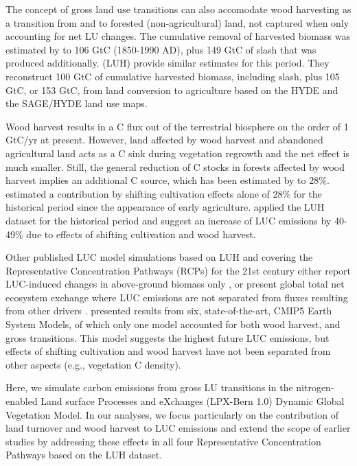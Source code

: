 The concept of gross land use transitions can also accomodate wood harvesting as a transition from and to forested (non-agricultural) land, not captured when only accounting for net LU changes. The cumulative removal of harvested biomass was estimated by \citet{houghton1999tel} to 106 GtC (1850-1990 AD), plus 149 GtC of slash that was produced additionally. \citet{hurtt06gcb} (LUH) provide similar estimates for this period. They reconstruct 100 GtC of cumulative harvested biomass, including slash, plus 105 GtC, or 153 GtC, from land conversion to agriculture based on the HYDE and the SAGE/HYDE land use maps. 

Wood harvest results in a C flux out of the terrestrial biosphere on the order of 1 GtC/yr at present. However, land affected by wood harvest and abandoned agricultural land acts as a C sink during vegetation regrowth and the net effect is much smaller. Still, the general reduction of C stocks in forests affected by wood harvest implies an additional C source, which has been estimated by \citet{houghton10tel} to 28\%. \citet{olofssonhickler2008} estimated a contribution by shifting cultivation effects alone of 28\% for the historical period since the appearance of early agriculture. \citet{shevliakova09gbc} applied the LUH dataset for the historical period and suggest an increase of LUC emissions by 40-49\% due to effects of shifting cultivation and wood harvest. 

Other published LUC model simulations based on LUH and covering the Representative Concentration Pathways (RCPs) \citep{vanvuuren11cc} for the 21st century either report LUC-induced changes in above-ground biomass only \citep{hurtt11}, or present global total net ecosystem exchange where LUC emissions are not separated from fluxes resulting from other drivers \citep{lawrence12jclim}. \citet{brovkin13jclim} presented results from six, state-of-the-art, CMIP5 Earth System Models, of which only one model accounted for both wood harvest, and gross transitions. This model suggests the highest future LUC emissions, but effects of shifting cultivation and wood harvest have not been separated from other aspects (e.g., vegetation C density).

Here, we simulate carbon emissions from gross LU transitions in the nitrogen-enabled Land surface Processes and eXchanges (LPX-Bern 1.0) Dynamic Global Vegetation Model. In our analyses, we focus particularly on the contribution of land turnover and wood harvest to LUC emissions and extend the scope of earlier studies by addressing these effects in all four Representative Concentration Pathways based on the LUH dataset.

